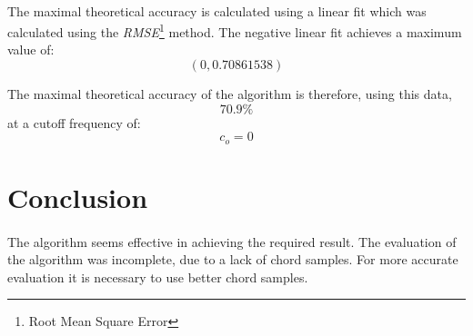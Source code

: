 \documentclass{article}
\begin{document}
\paragraph*{}
The maximal theoretical accuracy is calculated using a linear fit which was
calculated using the \textit{RMSE}\footnote{Root Mean Square Error} method. The
negative linear fit achieves a maximum value of:
$$(0, 0.70861538)$$

The maximal theoretical accuracy of the algorithm is therefore, using this data,
$$70.9\%$$
at a cutoff frequency of:
$$c_o = 0$$

\section{Conclusion}
\paragraph*{}
The algorithm seems effective in achieving the required result. The evaluation 
of the algorithm was incomplete, due to a lack of chord samples. For more 
accurate evaluation it is necessary to use better chord samples.

\clearpage
\pagebreak
\end{document}
